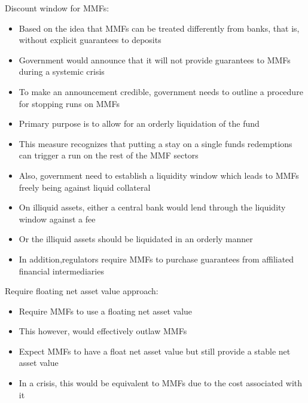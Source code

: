 \documentclass[11pt]{beamer}
\begin{document}
\begin{frame}
Discount window for MMFs:
\begin{itemize}
\item Based on the idea that MMFs can be treated differently from banks, that is, without explicit guarantees to deposits
\item Government would announce that it will not provide guarantees to MMFs during a systemic crisis
\item To make an announcement credible, government needs to outline a procedure for stopping runs on MMFs
\item Primary purpose is to allow for an orderly liquidation of the fund
\item This measure recognizes that putting a stay on a single funds redemptions can trigger a run on the rest of the MMF sectors
\item Also, government need to establish a liquidity window which leads to MMFs freely being against liquid collateral
\item On illiquid assets, either a central bank would lend through the liquidity window against a fee
\item Or the illiquid assets should be liquidated in an orderly manner
\item In addition,regulators require MMFs to purchase guarantees from affiliated financial intermediaries
\end{itemize}
\end{frame}

\begin{frame}
Require floating net asset value approach:
\begin{itemize}
\item Require MMFs to use a floating net asset value
\item This however, would effectively outlaw MMFs
\item Expect MMFs to have a float net asset value but still provide a stable net asset value
\item In a crisis, this would be equivalent to MMFs due to the cost associated with it
\end{itemize}
\end{frame}
\end{document}
